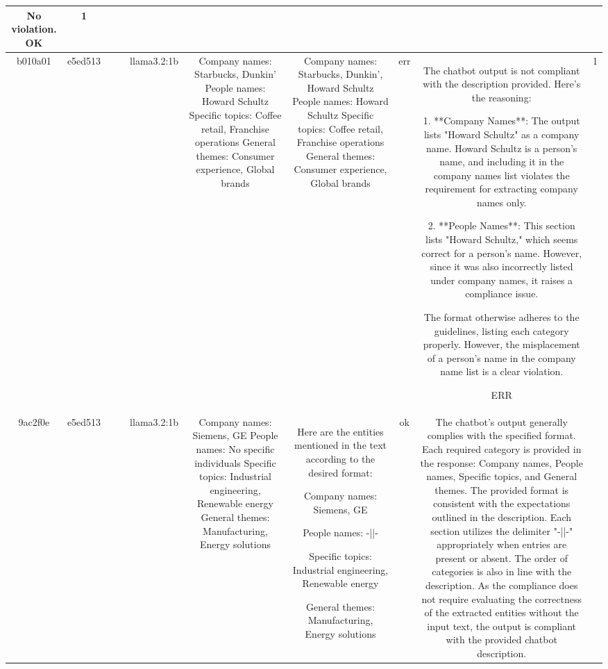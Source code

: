 \begin{table}[h!]
\begin{tabular}{|c|c|c|c|c|c|c|c|c|c|}
No violation.
OK & 1\\
\hline
b010a01 & e5ed513 &  &  & llama3.2:1b & Company names: Starbucks, Dunkin'
People names: Howard Schultz
Specific topics: Coffee retail, Franchise operations
General themes: Consumer experience, Global brands & Company names: Starbucks, Dunkin', Howard Schultz
People names: Howard Schultz
Specific topics: Coffee retail, Franchise operations
General themes: Consumer experience, Global brands & err & The chatbot output is not compliant with the description provided. Here's the reasoning:

1. **Company Names**: The output lists "Howard Schultz" as a company name. Howard Schultz is a person's name, and including it in the company names list violates the requirement for extracting company names only. 

2. **People Names**: This section lists "Howard Schultz," which seems correct for a person's name. However, since it was also incorrectly listed under company names, it raises a compliance issue.

The format otherwise adheres to the guidelines, listing each category properly. However, the misplacement of a person's name in the company name list is a clear violation.

ERR & 1\\
\hline
9ac2f0e & e5ed513 &  &  & llama3.2:1b & Company names: Siemens, GE
People names: No specific individuals
Specific topics: Industrial engineering, Renewable energy
General themes: Manufacturing, Energy solutions & Here are the entities mentioned in the text according to the desired format:

Company names: Siemens, GE

People names: -||-

Specific topics: Industrial engineering, Renewable energy

General themes: Manufacturing, Energy solutions & ok & The chatbot's output generally complies with the specified format. Each required category is provided in the response: Company names, People names, Specific topics, and General themes. The provided format is consistent with the expectations outlined in the description. Each section utilizes the delimiter "-||-" appropriately when entries are present or absent. The order of categories is also in line with the description. As the compliance does not require evaluating the correctness of the extracted entities without the input text, the output is compliant with the provided chatbot description.


\end{tabular}
\end{table}
